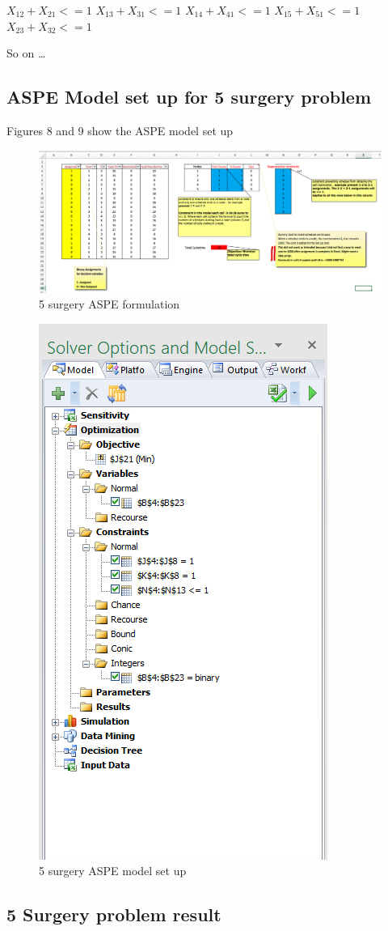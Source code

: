 \documentclass[]{article}
\begin{document}
\(X_{12} + X_{21} <= 1\) \(X_{13} + X_{31} <= 1\)
\(X_{14} + X_{41} <= 1\) \(X_{15} + X_{51} <= 1\)
\(X_{23} + X_{32} <= 1\)

So on \ldots{}

\subsection{ASPE Model set up for 5 surgery
problem}\label{aspe-model-set-up-for-5-surgery-problem}

Figures 8 and 9 show the ASPE model set up

\begin{figure}
\centering
\includegraphics[height=0.50000\textwidth]{Figures/Homework3/p3a.PNG}
\caption{5 surgery ASPE formulation}
\end{figure}

\begin{figure}
\centering
\includegraphics[height=0.50000\textwidth]{Figures/Homework3/modelp3a.PNG}
\caption{5 surgery ASPE model set up}
\end{figure}

\subsection{5 Surgery problem result}\label{surgery-problem-result}
\end{document}
